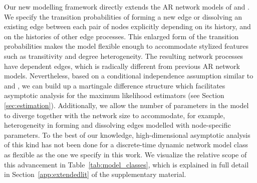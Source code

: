 \documentclass[12pt]{article}
\newcommand{\0}{{\bf 0}}
\begin{document}
Our new modelling framework directly extends the AR network models of \cite{Jiang2023} and \cite{Jiang2025}.
We specify the transition probabilities of forming a new edge or dissolving an existing edge between each pair of nodes explicitly depending on its history, and on the histories of other edge processes. This enlarged form of the transition probabilities makes the model flexible enough to accommodate stylized features such as transitivity and degree heterogeneity. The resulting network processes have dependent edges, which is radically different from previous AR network models.
Nevertheless, based on a conditional independence assumption similar to \cite{hanneke2010} and \cite{almquist2014logistic}, we can build up a martingale difference structure which facilitates asymptotic analysis for the maximum likelihood estimators (see Section \ref{sec:estimation}).
Additionally, we allow the number of parameters in the model to diverge together with the network size to accommodate, for example, heterogeneity in forming and dissolving edges modelled with node-specific parameters.
To the best of our knowledge, high-dimensional asymptotic analysis of this kind has not been done for a discrete-time dynamic network model class as flexible as the one we specify in this work. 
We visualize the relative scope of this advancement in Table~\ref{tab:model_classes}, which is explained in full detail in Section~\ref{app:extendedlit} of the supplementary material.
\end{document}
